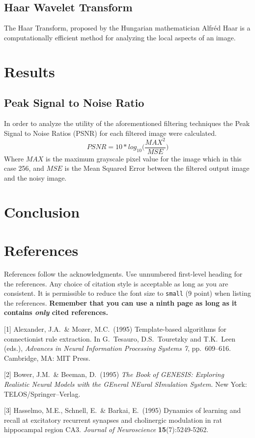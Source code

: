 \documentclass{article}
\begin{document}
\subsection{Haar Wavelet Transform}
The Haar Transform, proposed by the Hungarian mathematician Alfr\'ed Haar is a computationally efficient method for analyzing the local aspects of an image.



\section{Results}
\subsection{Peak Signal to Noise Ratio}
In order to analyze the utility of the aforementioned filtering techniques the Peak Signal to Noise Ratios (PSNR) for each filtered image were calculated. 
\begin{equation}\label{eqn:PSNR}
PSNR = 10*log_{10}\Big(\frac{MAX^2}{MSE}\Big)
\end{equation}	 
Where $MAX$ is the maximum grayscale pixel value for the image which in this case 256, and $MSE$ is the Mean Squared Error between the filtered output image and the noisy image.
\section{Conclusion}

\section*{References}

References follow the acknowledgments. Use unnumbered first-level
heading for the references. Any choice of citation style is acceptable
as long as you are consistent. It is permissible to reduce the font
size to \verb+small+ (9 point) when listing the references. {\bf
  Remember that you can use a ninth page as long as it contains
  \emph{only} cited references.}
\medskip

\small

[1] Alexander, J.A.\ \& Mozer, M.C.\ (1995) Template-based algorithms
for connectionist rule extraction. In G.\ Tesauro, D.S.\ Touretzky and
T.K.\ Leen (eds.), {\it Advances in Neural Information Processing
  Systems 7}, pp.\ 609--616. Cambridge, MA: MIT Press.

[2] Bower, J.M.\ \& Beeman, D.\ (1995) {\it The Book of GENESIS:
  Exploring Realistic Neural Models with the GEneral NEural SImulation
  System.}  New York: TELOS/Springer--Verlag.

[3] Hasselmo, M.E., Schnell, E.\ \& Barkai, E.\ (1995) Dynamics of
learning and recall at excitatory recurrent synapses and cholinergic
modulation in rat hippocampal region CA3. {\it Journal of
  Neuroscience} {\bf 15}(7):5249-5262.
\end{document}
